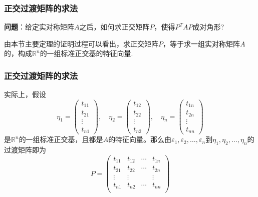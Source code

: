 
\begin{frame}
\frametitle{正交过渡矩阵的求法}

\begin{block}{}
{\bfseries 问题}：给定实对称矩阵$A$之后，如何求正交矩阵$P$，使得$P^TAP$成对角形?
\end{block}

\vspace{0.5em}
\pause

由本节主要定理的证明过程可以看出，求正交矩阵$P$，等于求一组实对称矩阵$A$的，构成$\mathbb{R}^n$的一组标准正交基的特征向量.

\end{frame}


\begin{frame}
\frametitle{正交过渡矩阵的求法}

实际上，假设
\[\eta_1 = \begin{pmatrix} t_{11} \\ t_{21} \\ \vdots \\ t_{n1} \end{pmatrix}, \quad \eta_2 = \begin{pmatrix} t_{12} \\ t_{22} \\ \vdots \\ t_{n2} \end{pmatrix}, \quad \eta_n = \begin{pmatrix} t_{1n} \\ t_{2n} \\ \vdots \\ t_{nn} \end{pmatrix}\]
是$\mathbb{R}^n$的一组标准正交基，且都是$A$的特征向量。那么由$\varepsilon_1, \varepsilon_2, \ldots, \varepsilon_n$到$\eta_1, \eta_2, \ldots, \eta_n$的过渡矩阵即为
\[P = \begin{pmatrix} t_{11} & t_{12} & \cdots & t_{1n} \\ t_{21} & t_{22} & \cdots & t_{2n} \\ \vdots & \vdots &  & \vdots \\ t_{n1} & t_{n2} & \cdots & t_{nn} \\\end{pmatrix}\]

\end{frame}

